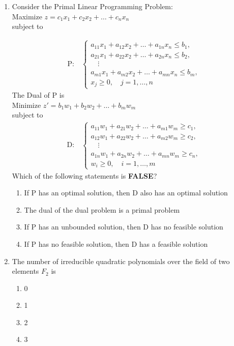 \documentclass[journal]{IEEEtran}
\numberwithin{equation}{enumi}
\numberwithin{figure}{enumi}
\begin{document}
\begin{enumerate}
\item  Consider the Primal Linear Programming Problem: \\
Maximize  $z = c_1x_1 + c_2x_2 + \dots + c_nx_n$  \\
subject to \hfill{}

\begin{align*}
\text{P:} \quad
\begin{cases}
a_{11}x_1 + a_{12}x_2 + \dots + a_{1n}x_n \le b_1, \\
a_{21}x_1 + a_{22}x_2 + \dots + a_{2n}x_n \le b_2, \\
\quad \vdots \\
a_{m1}x_1 + a_{m2}x_2 + \dots + a_{mn}x_n \le b_m, \\
x_j \ge 0, \quad j=1,\dots,n
\end{cases}
\end{align*}
The Dual of P is \\
Minimize \quad $z' = b_1w_1 + b_2w_2 + \dots + b_mw_m$ \\
subject to
\begin{align*}
\text{D:} \quad
\begin{cases}
a_{11}w_1 + a_{21}w_2 + \dots + a_{m1}w_m \ge c_1, \\
a_{12}w_1 + a_{22}w_2 + \dots + a_{m2}w_m \ge c_2, \\
\quad \vdots \\
a_{1n}w_1 + a_{2n}w_2 + \dots + a_{mn}w_m \ge c_n, \\
w_i \ge 0, \quad i=1,\dots,m
\end{cases}
\end{align*}
Which of the following statements is \textbf{FALSE}?
\begin{enumerate}
\item  If P has an optimal solution, then D also has an optimal solution 
\item  The dual of the dual problem is a primal problem 
\item  If P has an unbounded solution, then D has no feasible solution 
\item  If P has no feasible solution, then D has a feasible solution
\end{enumerate}

\newpage
\item The number of irreducible quadratic polynomials over the field of two elements $F_2$ is
\hfill{}
\begin{multicols}{4}
\begin{enumerate}
    \item 0
    \item 1
    \item 2
    \item 3
\end{enumerate}
\end{multicols}




\end{enumerate}
\end{document}
